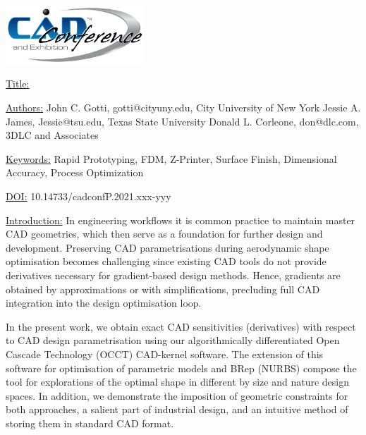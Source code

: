 \documentclass{article}
\begin{document}
{\centering  \includegraphics[width=5.173cm,height=2.193cm]{images/CADconverted-img001.jpg} \par}

\vspace{5pt}
\noindent
\underline{Title:}


\vspace{1em}
\noindent \underline{Authors:}
\newline
John C. Gotti, gotti@cityuny.edu, City University of New York \newline
Jessie A. James, Jessie@tsu.edu, Texas State University \newline
Donald L. Corleone, don@dlc.com, 3DLC and Associates

\vspace{1em}
\noindent \underline{Keywords:}\newline
Rapid Prototyping, FDM, Z-Printer, Surface Finish, Dimensional Accuracy, Process Optimization


\bigskip


\noindent \underline{DOI:} 10.14733/cadconfP.2021.xxx-yyy

\vspace{10pt}
\noindent\underline{Introduction:}\vspace{0.2em}\newline
In engineering workflows it is common practice to maintain master CAD geometries, which then serve as a foundation for further design and development. Preserving CAD parametrisations during aerodynamic shape optimisation becomes challenging since existing CAD tools do not provide derivatives necessary for gradient-based design methods. Hence, gradients are obtained by approximations or with simplifications, precluding full CAD integration into the design optimisation loop.

 
In the present work, we obtain exact CAD sensitivities (derivatives) with respect to CAD design parametrisation using our algorithmically differentiated Open Cascade Technology (OCCT) CAD-kernel software.  The extension of this software for optimisation of parametric models and BRep (NURBS) compose the tool for explorations of the optimal shape in different by size and nature design spaces. In addition, we demonstrate the imposition of geometric constraints for both approaches, a salient part of industrial design, and an intuitive method of storing them in standard CAD format.\newline
\end{document}
